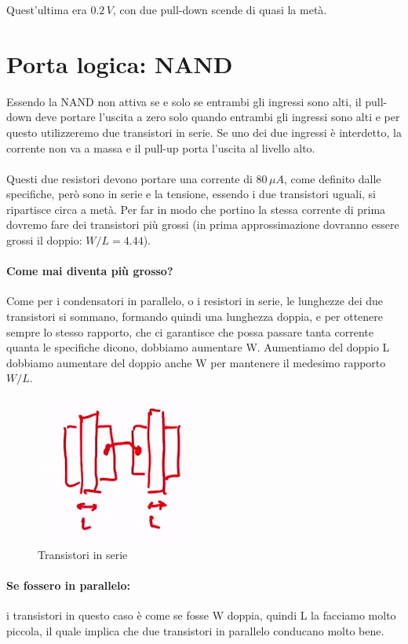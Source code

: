 Quest'ultima era $0.2\,V$, con due pull-down scende di quasi la metà.

\newpage
\section{Porta logica: NAND}

Essendo la NAND non attiva se e solo se entrambi gli ingressi sono alti, il pull-down deve portare l'uscita a zero solo quando entrambi gli ingressi sono alti e per questo utilizzeremo due transistori in serie. Se uno dei due ingressi è interdetto, la corrente non va a massa e il pull-up porta l'uscita al livello alto.

\paragraph{}
Questi due resistori devono portare una corrente di $80\,\mu A$, come definito dalle specifiche, però sono in serie e la tensione, essendo i due transistori uguali, si ripartisce circa a metà. Per far in modo che portino la stessa corrente di prima dovremo fare dei transistori più grossi (in prima approssimazione dovranno essere grossi il doppio: $W/L = 4.44$).

\paragraph{Come mai diventa più grosso?} Come per i condensatori in parallelo, o i resistori in serie, le lunghezze dei due transistori si sommano, formando quindi una lunghezza doppia, e per ottenere sempre lo stesso rapporto, che ci garantisce che possa passare tanta corrente quanta le specifiche dicono, dobbiamo aumentare W. Aumentiamo del doppio L dobbiamo aumentare del doppio anche W per mantenere il medesimo rapporto $W/L$.

\begin{figure}[htbp]
    \centering
    \includegraphics[width=0.25\linewidth]{img/trans, serie.png}
    \caption{Transistori in serie}    
\end{figure}
 
\paragraph{Se fossero in parallelo: } i transistori in questo caso è come se fosse W doppia, quindi L la facciamo molto piccola, il quale implica che due transistori in parallelo conducano molto bene.

